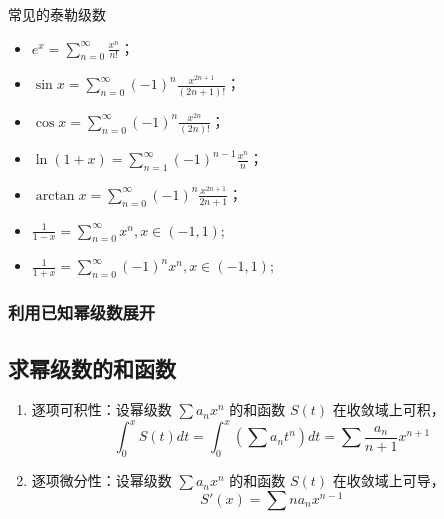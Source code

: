 常见的泰勒级数
\begin{itemize}
    \item $e^{x} = \sum\limits_{n=0}^{\infty} \frac{x^{n}}{n!}$；
    \item $\sin x = \sum\limits_{n=0}^{\infty} (-1)^{n} \frac{x^{2n+1}}{(2n+1)!}$；
    \item $\cos x = \sum\limits_{n=0}^{\infty} (-1)^{n} \frac{x^{2n}}{(2n)!}$；
    \item $\ln(1+x) = \sum\limits_{n=1}^{\infty} (-1)^{n-1} \frac{x^{n}}{n}$；
    \item $\arctan x = \sum\limits_{n=0}^{\infty} (-1)^{n} \frac{x^{2n+1}}{2n+1}$；
    \item $\frac{1}{1-x} = \sum\limits_{n=0}^{\infty} x^{n},x\in(-1,1)$;
    \item $\frac{1}{1+x} = \sum\limits_{n=0}^{\infty} (-1)^{n} x^{n},x\in(-1,1)$;
\end{itemize}

\subsubsection{利用已知幂级数展开}

\subsection{求幂级数的和函数}

\begin{theorem}[性质]
    \begin{enumerate}
        \item 逐项可积性：设幂级数 $\sum a_{n} x^{n}$ 的和函数 $S(t)$ 在收敛域上可积，
              \[\int_{0}^{x}S(t)dt=\int_{0}^x(\sum a_n t^n)dt =\sum \frac{a_n}{n+1}x^{n+1}\]
        \item 逐项微分性：设幂级数 $\sum a_{n} x^{n}$ 的和函数 $S(t)$ 在收敛域上可导，
              \[S'(x)=\sum na_n x^{n-1}\]
    \end{enumerate}
\end{theorem}